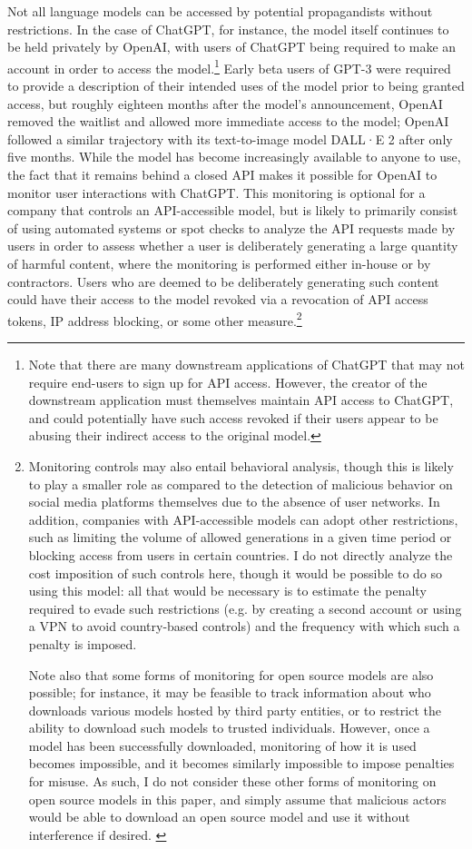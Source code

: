 \documentclass{article}
\begin{document}
Not all language models can be accessed by potential propagandists without restrictions. In the case of ChatGPT, for instance, the model itself continues to be held privately by OpenAI, with users of ChatGPT being required to make an account in order to access the model.\footnote{Note that there are many downstream applications of ChatGPT that may not require end-users to sign up for API access. However, the creator of the downstream application must themselves maintain API access to ChatGPT, and could potentially have such access revoked if their users appear to be abusing their indirect access to the original model.} Early beta users of GPT-3 were required to provide a description of their intended uses of the model prior to being granted access, but roughly eighteen months after the model's announcement, OpenAI removed the waitlist and allowed more immediate access to the model; OpenAI followed a similar trajectory with its text-to-image model DALL·E 2 after only five months.\cite{dallewaitlist, gpt3waitlist} While the model has become increasingly available to anyone to use, the fact that it remains behind a closed API makes it possible for OpenAI to monitor user interactions with ChatGPT. This monitoring is optional for a company that controls an API-accessible model, but is likely to primarily consist of using automated systems or spot checks to analyze the API requests made by users in order to assess whether a user is deliberately generating a large quantity of harmful content, where the monitoring is performed either in-house or by contractors. Users who are deemed to be deliberately generating such content could have their access to the model revoked via a revocation of API access tokens, IP address blocking, or some other measure.\footnote{Monitoring controls may also entail behavioral analysis, though this is likely to play a smaller role as compared to the detection of malicious behavior on social media platforms themselves due to the absence of user networks. In addition, companies with API-accessible models can adopt other restrictions, such as limiting the volume of allowed generations in a  given time period or blocking access from users in certain countries. I do not directly analyze the cost imposition of such controls here, though it would be possible to do so using this model: all that would be necessary is to estimate the penalty required to evade such restrictions (e.g. by creating a second account or using a VPN to avoid country-based controls) and the frequency with which such a penalty is imposed.

Note also that some forms of monitoring for open source models are also possible; for instance, it may be feasible to track information about who downloads various models hosted by third party entities, or to restrict the ability to download such models to trusted individuals. However, once a model has been successfully downloaded, monitoring of how it is used becomes impossible, and it becomes similarly impossible to impose penalties for misuse. As such, I do not consider these other forms of monitoring on open source models in this paper, and simply assume that malicious actors would be able to download an open source model and use it without interference if desired. \label{opensourcemonitoring}}
\end{document}
